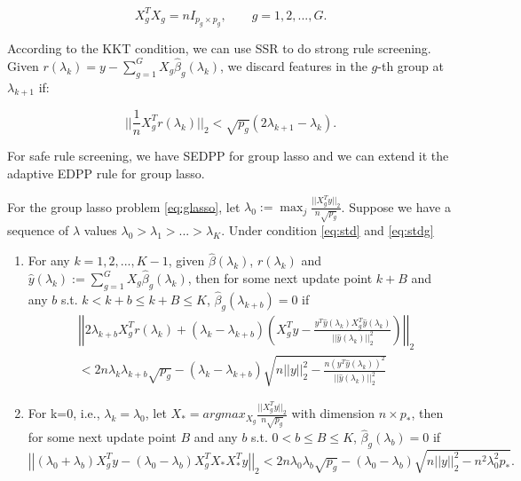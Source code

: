 \begin{equation}
    \label{eq:stdg}
    X_g^TX_g=nI_{p_g\times p_g},\qquad g=1,2,...,G.
\end{equation}

According to the KKT condition, we can use SSR to do strong rule screening. Given $r(\lambda_k)=y-\sum_{g=1}^GX_g\hat{\beta}_g(\lambda_k)$, we discard features in the $g$-th group at $\lambda_{k+1}$ if:

\begin{equation}
    \bigg|\bigg|\frac{1}{n}X_g^Tr(\lambda_k)\bigg|\bigg|_2<\sqrt{p_g}(2\lambda_{k+1}-\lambda_k).
\end{equation}

For safe rule screening, we have SEDPP for group lasso\citep{wang2013lasso} and we can extend it the adaptive EDPP rule for group lasso.

\begin{theorem}
For the group lasso problem \eqref{eq:glasso}, let $\lambda_0:=\max_j\frac{||X_g^Ty||_2}{n\sqrt{p_g}}$. Suppose we have a sequence of $\lambda$ values $\lambda_0>\lambda_1>...>\lambda_K$. Under condition \eqref{eq:std} and \eqref{eq:stdg}
    \begin{enumerate}
        \item For any $k=1,2,...,K-1$, given $\hat{\beta}(\lambda_k)$, $r(\lambda_k)$ and $\hat{y}(\lambda_k):=\sum_{g=1}^GX_g\hat{\beta}_g(\lambda_k)$, then for some next update point $k+B$ and any $b$ s.t. $k<k+b\leq k+B\leq K$, $\hat{\beta}_g(\lambda_{k+b})=0$ if
        \begin{equation}
            \begin{split}
                &\left|\left|2\lambda_{k+b}X_g^Tr(\lambda_k)+(\lambda_k-\lambda_{k+b})\left( X_g^Ty-\frac{y^T\hat{y}(\lambda_k)X_g^T\hat{y}(\lambda_k)}{||\hat{y}(\lambda_k)||_2^2}\right)\right|\right|_2\\
                &<2n\lambda_k\lambda_{k+b}\sqrt{p_g}-(\lambda_k-\lambda_{k+b})\sqrt{n||y||_2^2-\frac{n(y^T\hat{y}(\lambda_k))^2}{||\hat{y}(\lambda_k)||_2^2}}
            \end{split}
        \end{equation}
        \item For k=0, i.e., $\lambda_k=\lambda_0$, let $X_*=argmax_{X_g}\frac{||X_g^Ty||_2}{n\sqrt{p_g}}$ with dimension $n\times p_*$, then for some next update point $B$ and any $b$ s.t. $0<b\leq B\leq K$, $\hat{\beta}_g(\lambda_{b})=0$ if
        \begin{equation}
        \left|\left|(\lambda_0+\lambda_b)X_g^Ty-(\lambda_0-\lambda_b)X_g^TX_*X_*^Ty\right|\right|_2<2n\lambda_0\lambda_b\sqrt{p_g}-(\lambda_0-\lambda_b)\sqrt{n||y||_2^2-n^2\lambda_0^2p_*}.
    \end{equation}
    \end{enumerate}
\end{theorem}

